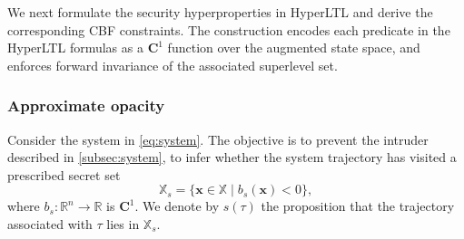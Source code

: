 \documentclass[journal,twoside,web]{ieeecolor}
\begin{document}
We next formulate the security hyperproperties in HyperLTL and derive the corresponding CBF constraints. The construction encodes each predicate in the HyperLTL formulas as a $\mathbf{C}^1$ function over the augmented state space, and enforces forward invariance of the associated superlevel set.

\subsubsection{Approximate opacity}

Consider the system in \eqref{eq:system}. The objective is to prevent the intruder described in \ref{subsec:system}, to infer whether the system trajectory has visited a prescribed secret set
\begin{equation} \label{eq:secret_set}
    \mathbb{X}_s = \{ \mathbf{x} \in \mathbb{X} \mid b_s(\mathbf{x}) < 0 \},
\end{equation}
where $b_s:\mathbb{R}^n \to \mathbb{R}$ is $\mathbf{C}^1$. We denote by $s(\tau)$ the proposition that the trajectory associated with $\tau$ lies in $\mathbb{X}_s$.
\end{document}
